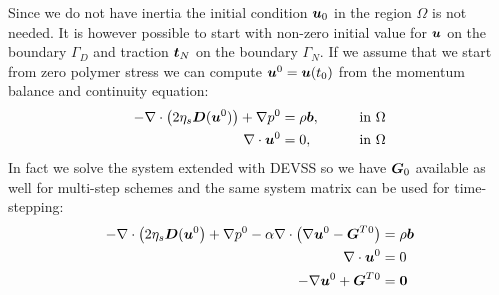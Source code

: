 Since we do not have inertia the initial condition $\boldsymbol{u}_0$ in the region
$\Omega$ is not needed. It is however possible to start with non-zero initial
value for $\boldsymbol{u}$ on the boundary $\Gamma_D$ and traction $\boldsymbol{t}_N$ on the
boundary $\Gamma_N$. If we assume that we start from zero polymer stress we can
compute $\boldsymbol{u}^0=\boldsymbol{u}(t_0)$ from the momentum balance and continuity
equation:
\begin{alignat}{2}
      -\nabla\cdot\big(2\eta_s\boldsymbol{D}(\boldsymbol{u}^0)\big)+\nabla p^0
        &=\rho\boldsymbol{b},\qquad&&\text{in }\Omega\\
\nabla\cdot\boldsymbol{u}^0&=0,\qquad&&\text{in }\Omega
\end{alignat}
In fact we solve the system extended with DEVSS so we have
$\boldsymbol{G}_0$ available as
well for multi-step schemes and the same 
system matrix can be used for time-stepping:
\begin{align}
      -\nabla\cdot\big(2\eta_s\boldsymbol{D}(\boldsymbol{u}^{0}\big) +\nabla p^{0} 
  -\alpha\nabla\cdot\big(\nabla\boldsymbol{u}^{0} -\boldsymbol{G}^T{}^{0} \big)
         &= \rho\boldsymbol{b} \\
     \nabla\cdot\boldsymbol{u}^{0}&=0\\
   -\nabla\boldsymbol{u}^{0} + \boldsymbol{G}^T{}^{0} &= \boldsymbol{0}
\end{align}

